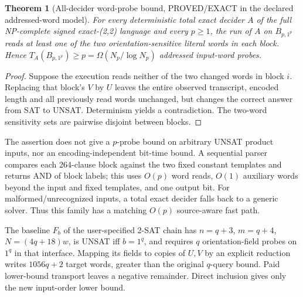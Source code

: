 \documentclass[11pt]{article}
\newtheorem{theorem}{Theorem}
\begin{document}
\begin{theorem}[All-decider word-probe bound, PROVED/EXACT in the declared addressed-word model]
For every deterministic total exact decider $A$ of the full NP-complete signed exact-(2,2) language and every $p\ge1$, the run of $A$ on $B_{p,1^p}$ reads at least one of the \emph{two} orientation-sensitive literal words in each block. Hence $T_A(B_{p,1^p})\ge p=\Omega(N_p/\log N_p)$ addressed input-word probes.
\end{theorem}
\begin{proof}
Suppose the execution reads neither of the two changed words in block $i$. Replacing that block's $V$ by $U$ leaves the entire observed transcript, encoded length and all previously read words unchanged, but changes the correct answer from SAT to UNSAT. Determinism yields a contradiction. The two-word sensitivity sets are pairwise disjoint between blocks.
\end{proof}
The assertion does not give a $p$-probe bound on arbitrary UNSAT product inputs, nor an encoding-independent bit-time bound. A sequential parser compares each 264-clause block against the two fixed constant templates and returns AND of block labels; this uses $O(p)$ word reads, $O(1)$ auxiliary words beyond the input and fixed templates, and one output bit. For malformed/unrecognized inputs, a total exact decider falls back to a generic solver. Thus this family has a matching $O(p)$ source-aware fast path.

The baseline $F_b$ of the user-specified 2-SAT chain has $n=q+3$, $m=q+4$, $N=(4q+18)w$, is UNSAT iff $b=1^q$, and requires $q$ orientation-field probes on $1^q$ in that interface. Mapping its fields to copies of $U,V$ by an explicit reduction writes $1056q+2$ target words, greater than the original $q$-query bound. Paid lower-bound transport leaves a negative remainder. Direct inclusion gives only the new input-order lower bound.
\end{document}
